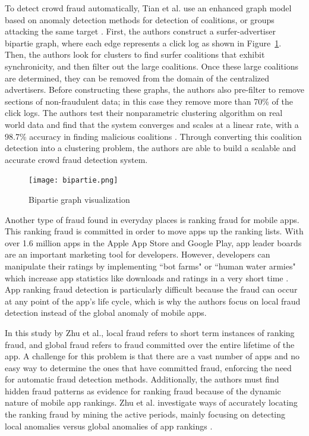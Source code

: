\documentclass[midd]{thesis}
\begin{document}
To detect crowd fraud automatically, Tian et al. use an enhanced graph model based on anomaly detection methods for detection of coalitions, or groups attacking the same target \cite{Tian}. First, the authors construct a surfer-advertiser bipartie graph, where each edge represents a click log as shown in Figure~\ref{fig:bipartie}. Then, the authors look for clusters to find surfer coalitions that exhibit synchronicity, and then filter out the large coalitions. Once these large coalitions are determined, they can be removed from the domain of the centralized advertisers. Before constructing these graphs, the authors also pre-filter to remove sections of non-fraudulent data; in this case they remove more than 70\% of the click logs. The authors test their nonparametric clustering algorithm on real world data and find that the system converges and scales at a linear rate, with a 98.7\% accuracy in finding malicious coalitions \cite{Tian}. Through converting this coalition detection into a clustering problem, the authors are able to build a scalable and accurate crowd fraud detection system. 

\begin{figure} %
  \texttt{[image: bipartie.png]}
  \caption{Bipartie graph visualization \cite{Tian}}
  \label{fig:bipartie}
\end{figure}

Another type of fraud found in everyday places is ranking fraud for mobile apps. This ranking fraud is committed in order to move apps up the ranking lists. With over 1.6 million apps in the Apple App Store and Google Play, app leader boards are an important marketing tool for developers. However, developers can manipulate their ratings by implementing ``bot farms" or ``human water armies" which increase app statistics like downloads and ratings in a very short time  \cite{Zhu2015}. App ranking fraud detection is particularly difficult because the fraud can occur at any point of the app's life cycle, which is why the authors focus on local fraud detection instead of the global anomaly of mobile apps. 

In this study by Zhu et al., local fraud refers to short term instances of ranking fraud, and global fraud refers to fraud committed over the entire lifetime of the app. A challenge for this problem is that there are a vast number of apps and no easy way to determine the ones that have committed fraud, enforcing the need for automatic fraud detection methods. Additionally, the authors must find hidden fraud patterns as evidence for ranking fraud because of the dynamic nature of mobile app rankings. Zhu et al. investigate ways of accurately locating the ranking fraud by mining the active periods, mainly focusing on detecting local anomalies versus global anomalies of app rankings \cite{Zhu2015}. 
\end{document}
